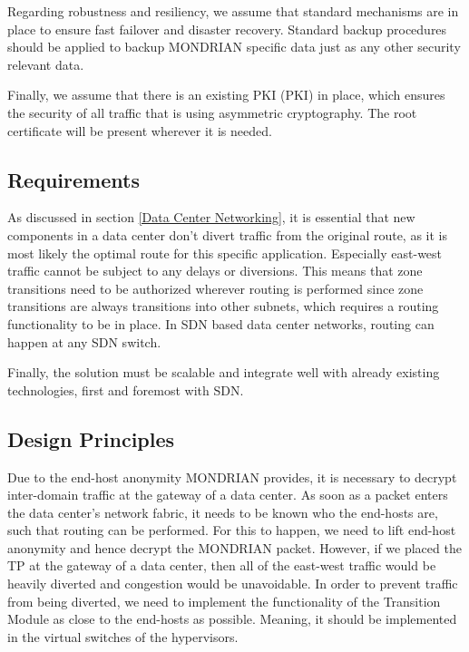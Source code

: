 Regarding robustness and resiliency, we assume that standard mechanisms are in place to ensure fast failover and disaster recovery. Standard backup procedures should be applied to backup MONDRIAN specific data just as any other security relevant data.

Finally, we assume that there is an existing \acs{PKI} (\acl{PKI}) in place, which ensures the security of all traffic that is using asymmetric cryptography. The root certificate will be present wherever it is needed.
\subsection{Requirements}
As discussed in section \ref{Data Center Networking}, it is essential that new components in a data center don't divert traffic from the original route, as it is most likely the optimal route for this specific application. Especially east-west traffic cannot be subject to any delays or diversions. This means that zone transitions need to be authorized wherever routing is performed since zone transitions are always transitions into other subnets, which requires a routing functionality to be in place. In \acs{SDN} based data center networks, routing can happen at any \acs{SDN} switch.

Finally, the solution must be scalable and integrate well with already existing technologies, first and foremost with \acs{SDN}.

\subsection{Design Principles}
Due to the end-host anonymity MONDRIAN provides, it is necessary to decrypt inter-domain traffic at the gateway of a data center. As soon as a packet enters the data center's network fabric, it needs to be known who the end-hosts are, such that routing can be performed. For this to happen, we need to lift end-host anonymity and hence decrypt the MONDRIAN packet. However, if we placed the \acs{TP} at the gateway of a data center, then all of the east-west traffic would be heavily diverted and congestion would be unavoidable. In order to prevent traffic from being diverted, we need to implement the functionality of the Transition Module as close to the end-hosts as possible. Meaning, it should be implemented in the virtual switches of the hypervisors. 

